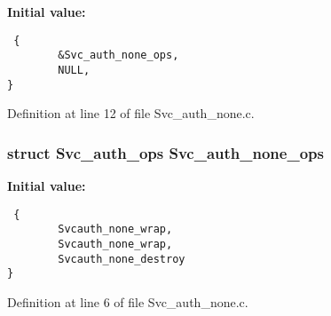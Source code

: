 {\bf Initial value:}

\footnotesize\begin{verbatim} {
        &Svc_auth_none_ops,
        NULL,
}
\end{verbatim}\normalsize 


Definition at line 12 of file Svc\_\-auth\_\-none.c.
\subsubsection{\setlength{\rightskip}{0pt plus 5cm}struct Svc\_\-auth\_\-ops {\bf Svc\_\-auth\_\-none\_\-ops}}\label{Svc__auth__none_8c_a0}


{\bf Initial value:}

\footnotesize\begin{verbatim} {
        Svcauth_none_wrap,
        Svcauth_none_wrap,
        Svcauth_none_destroy
}
\end{verbatim}\normalsize 


Definition at line 6 of file Svc\_\-auth\_\-none.c.